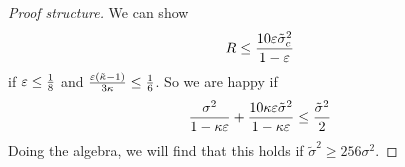 \begin{proof}[Proof structure]
  We can show
  \begin{align}
    R \leq \frac{10 \varepsilon \tilde{\sigma}_c^2}{1 - \varepsilon} 
  \end{align}
  if $\varepsilon \leq \frac{1}{8}$ and $\frac{\varepsilon (\tilde{\kappa} - 1)}{3 \kappa} \leq \frac{1}{6}$.
  So we are happy if
  \begin{align}
    \frac{\sigma^2}{1 - \kappa \varepsilon} + \frac{10 \kappa \varepsilon \tilde{\sigma}^2}{1 - \kappa \varepsilon}
    \leq \frac{\tilde{\sigma}^2}{2} 
  \end{align}
  Doing the algebra, we will find that this holds if $\tilde{\sigma}^2 \geq 256 \sigma^2$.
\end{proof}

